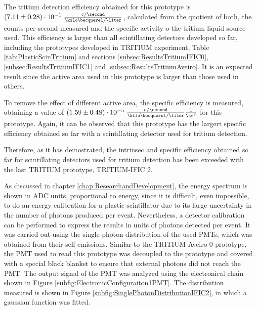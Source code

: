 The tritium detection efficiency obtained for this prototype is $(7.11 \pm 0.28)\cdot{} 10^{-1}~ \frac{\text{c}/\second}{\kilo\becquerel/\liter}$, calculated from the quotient of both, the counts per second measured and the specific activity o the tritium liquid source used. This efficiency is larger than all scintillating detectors developed so far, including the prototypes developed in TRITIUM experiment, Table \ref{tab:PlasticScinTritium} and sections \ref{subsec:ResultsTritiumIFIC0}, \ref{subsec:ResultsTritiumIFIC1} and \ref{subsec:ResultsTritiumAveiro}. It is an expected result since the active area used in this prototype is larger than those used in others.

To remove the effect of different active area, the specific efficiency is measured, obtaining a value of $(1.59 \pm 0.48)\cdot{} 10^{-5}~ \frac{\text{c}/\second}{\kilo\becquerel/\liter}\frac{1}{\cm^{2}}$ for this prototype. Again, it can be observed that this prototype has the largert specific efficiency obtained so far with a scintillating detector used for tritium detection.

Therefore, as it has demostrated, the intrinsec and specific efficiency obtained so far for scintillating detectors used for tritium detection has been exceeded with the last TRITIUM prototype, TRITIUM-IFIC 2.

As discussed in chapter \ref{chap:ResearchandDevelopment}, the energy spectrum is shown in ADC units, proportional to energy, since it is difficult, even impossible, to do an energy calibration for a plastic scintillator due to its large uncertainty in the number of photons produced per event. Nevertheless, a detector calibration can be performed to express the results in units of photons detected per event. It was carried out using the single-photon distribution of the used PMTs, which was obtained from their self-emissions. Similar to the TRITIUM-Aveiro 0 prototype, the PMT used to read this prototype was decoupled to the prototype and covered with a special black blanket to ensure that external photons did not reach the PMT. The output signal of the PMT was analyzed using the electronical chain shown in Figure \ref{subfig:ElectronicConfiguraiton1PMT}. The distribution measured is shown in Figure \ref{subfig:SinglePhotonDistributionIFIC2}, in which a gaussian function was fitted.

